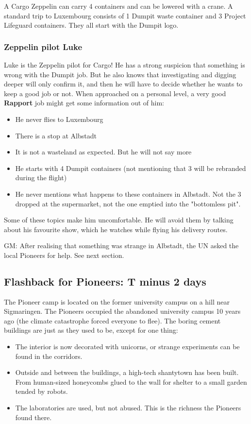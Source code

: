 A Cargo Zeppelin can carry 4 containers and can be lowered with a crane. A standard trip to Luxembourg consists of 1 Dumpit waste container and 3 Project Lifeguard containers. They all start with the Dumpit logo.

\subsubsection{Zeppelin pilot Luke}

Luke is the Zeppelin pilot for Cargo! He has a strong suspicion that something is wrong with the Dumpit job. But he also knows that investigating and digging deeper will only confirm it, and then he will have to decide whether he wants to keep a good job or not. When approached on a personal level, a very good \textbf{Rapport} job might get some information out of him:
\begin{itemize}
    \item He never flies to Luxembourg
    \item There is a stop at Albstadt
    \item It is not a wasteland as expected. But he will not say more
    \item He starts with 4 Dumpit containers (not mentioning that 3 will be rebranded during the flight)
    \item He never mentions what happens to these containers in Albstadt. Not the 3 dropped at the supermarket, not the one emptied into the "bottomless pit".
\end{itemize}

Some of these topics make him uncomfortable. He will avoid them by talking about his favourite show, which he watches while flying his delivery routes.

GM: After realising that something was strange in Albstadt, the UN asked the local Pioneers for help. See next section.

\subsection{Flashback for Pioneers: T minus 2 days}

The Pioneer camp is located on the former university campus on a hill near Sigmaringen. The Pioneers occupied the abandoned university campus 10 years ago (the climate catastrophe forced everyone to flee). The boring cement buildings are just as they used to be, except for one thing:

\begin{itemize}
    \item The interior is now decorated with unicorns, or strange experiments can be found in the corridors.
    \item Outside and between the buildings, a high-tech shantytown has been built. From human-sized honeycombs glued to the wall for shelter to a small garden tended by robots.
    \item The laboratories are used, but not abused. This is the richness the Pioneers found there.
\end{itemize}

